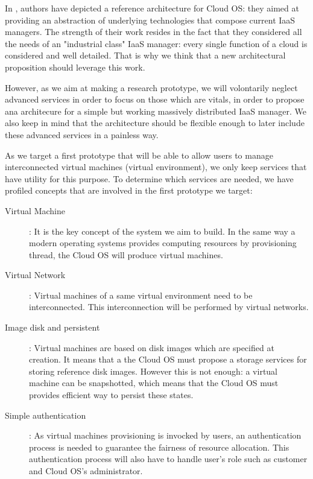 In \cite{moreno2012iaas}, authors have depicted a reference architecture for 
Cloud OS: they aimed at providing an abstraction of underlying technologies that
compose current IaaS managers. The strength of their work resides in the fact
that they considered all the needs of an "industrial class" IaaS manager: every
single function of a cloud is considered and well detailed. That is why we think
that a new architectural proposition should leverage this work.

However, as we aim at making a research prototype, we will volontarily neglect
advanced services in order to focus on those which are vitals, in order to 
propose ana architecure for a simple but working massively distributed IaaS
manager. We also keep in mind that the architecture should be flexible enough to
later include these advanced services in a painless way.

As we target a first prototype that will be able to allow users to manage 
interconnected virtual machines (virtual environment), we only keep services 
that have utility for this purpose. To determine which services are needed, we
have profiled concepts that are involved in the first prototype we target:

\label{cloud_os_concepts}

\begin{description}

	\item [Virtual Machine] : It is the key concept of the system we aim
	to build. In the same way a modern operating systems provides 
	computing resources by provisioning thread, the Cloud OS will 
	produce virtual machines.

	\item [Virtual Network] : Virtual machines of a same virtual 
	environment need to be interconnected. This interconnection will be
	performed by virtual networks.

	\item [Image disk and persistent] : Virtual machines are based on 
	disk images which are specified at creation. It means that a the 
	Cloud OS must propose a storage services for storing reference disk
	images. However this is not enough: a virtual machine can be
	snapshotted, which means that the Cloud OS must provides efficient
	way to persist these states.

	\item [Simple authentication] : As virtual machines provisioning is
	invocked by users, an authentication process is needed to guarantee
	the fairness of resource allocation. This authentication process
	will also have to handle user's role such as customer and Cloud OS's
	administrator.

\end{description}





